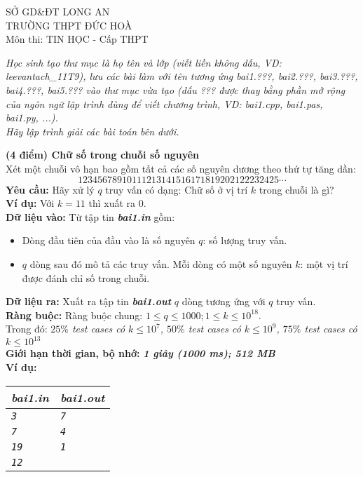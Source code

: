 \begin{name}
	{SỞ GD\&ĐT LONG AN \\ TRƯỜNG THPT ĐỨC HOÀ}
	{\testname \\ Môn thi: TIN HỌC - Cấp THPT}
\end{name}

\textit{Học sinh tạo thư mục là họ tên và lớp (viết liền không dấu, VD: leevantach\_11T9), lưu các bài làm với tên tương ứng bai1.???, bai2.???, bai3.???, bai4.???, bai5.??? vào thư mục vừa tạo (dấu ??? được thay bằng phần mở rộng của ngôn ngữ lập trình dùng để viết chương trình, VD: bai1.cpp, bai1.pas, bai1.py, ...).\\
Hãy lập trình giải các bài toán bên dưới.}

\begin{ex}
	\textbf{(4 điểm) Chữ số trong chuỗi số nguyên}\\
	Xét một chuỗi vô hạn bao gồm tất cả các số nguyên dương theo thứ tự tăng dần: 
	$$12345678910111213141516171819202122232425\cdots$$
	\textbf{Yêu cầu: }Hãy xử lý $q$ truy vấn có dạng: Chữ số ở vị trí $k$ trong chuỗi là gì?\\
	\textbf{Ví dụ: } Với $k=11$ thì xuất ra $0$.\\
	\textbf{Dữ liệu vào: } Từ tập tin \textit{\textbf{bai1.in}} gồm: 
	\begin{itemize}
		\item Dòng đầu tiên của đầu vào là số nguyên $q$: số lượng truy vấn. 
		\item $q$ dòng sau đó mô tả các truy vấn. Mỗi dòng có một số nguyên $k$: một vị trí được đánh chỉ số trong chuỗi. 
	\end{itemize}
	\textbf{Dữ liệu ra: } Xuất ra tập tin \textit{\textbf{bai1.out}} $q$ dòng tương ứng với $q$ truy vấn.\\
	\textbf{Ràng buộc: } Ràng buộc chung: $1 \leq q \leq 1000; 1 \leq k \leq 10^{18}$.\\
	 Trong đó: 
	\textit{$25\%$ test cases có $k \leq 10^7$,  $50\%$ test cases có $k \leq 10^9$,  $75\%$ test cases có $k \leq 10^{13}$}\\
	\textbf{Giới hạn thời gian, bộ nhớ: } \textbf{\textit{1 giây (1000 ms); 512 MB}} \\
	\textbf{Ví dụ: }
	\begin{center}
		\begin{tabular}{|l|l|}
			\hline
			\textit{\textbf{\textsf{bai1.in}}} & \textit{\textbf{\textsf{bai1.out}}} \\ %
			\hline
			\textit{\texttt{3}} & \textit{\texttt{7}} \\ %
			\textit{\texttt{7}} & \textit{\texttt{4}} \\ %
			\textit{\texttt{19}} & \textit{\texttt{1}} \\ %
			\textit{\texttt{12}} &  \\ %
			\hline
		\end{tabular}
	\end{center}
\end{ex}

